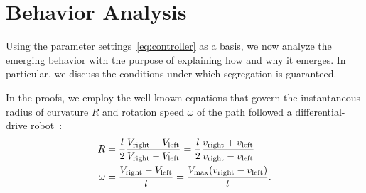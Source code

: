 \documentclass[conference]{IEEEtran}
\begin{document}
\section{Behavior Analysis}
\label{sec:analysis}
Using the parameter settings~\eqref{eq:controller} as a basis, we now analyze
the emerging behavior with the purpose of explaining how and why it emerges. In
particular, we discuss the conditions under which segregation is guaranteed.
\newcommand{\ICC}{\ensuremath{\text{ICC}}}

In the proofs, we employ the well-known equations that govern the instantaneous
radius of curvature $R$ and rotation speed $\omega$ of the path followed a
differential-drive robot~\cite{Dudek2010}:
\begin{equation}
  \label{eq:Ricc}
  \begin{aligned}
    R &= \frac{l}{2}\frac{\vaR + \vaL}{\vaR - \vaL} = \frac{l}{2}\frac{\vR + \vL}{\vR - \vL}\\
    \omega &= \frac{\vaR - \vaL}{l} = \frac{\VM(\vR - \vL)}{l}.
  \end{aligned}
\end{equation}
\end{document}

